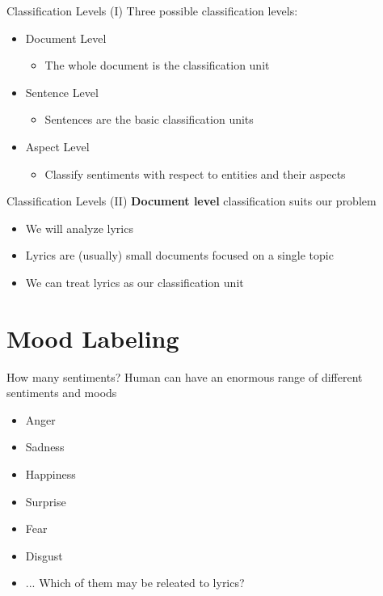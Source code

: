 \documentclass[xcolor=dvipsnames]{beamer}
\begin{document}
\begin{frame}{Classification Levels (I)}
Three possible classification levels:
\begin{itemize}
\item Document Level 
\begin{itemize}
\item The whole document is the classification unit
\end{itemize}
\item Sentence Level
\begin{itemize}
\item Sentences are the basic classification units
\end{itemize}
\item Aspect Level
\begin{itemize}
\item Classify sentiments with respect to entities and their aspects
\end{itemize}
\end{itemize}
\end{frame}

\begin{frame}{Classification Levels (II)}
\textbf{Document level} classification suits our problem
\begin{itemize}
\item We will analyze lyrics
\item Lyrics are (usually) small documents focused on a single topic
\item We can treat lyrics as our classification unit
\end{itemize}
\end{frame}


\section{Mood Labeling}

\begin{frame}{How many sentiments?}
Human can have an enormous range of different sentiments and moods
\begin{itemize}
\item Anger
\item Sadness
\item Happiness
\item Surprise
\item Fear
\item Disgust
\item ...
Which of them may be releated to lyrics?
\end{itemize}
\end{frame}
\end{document}
